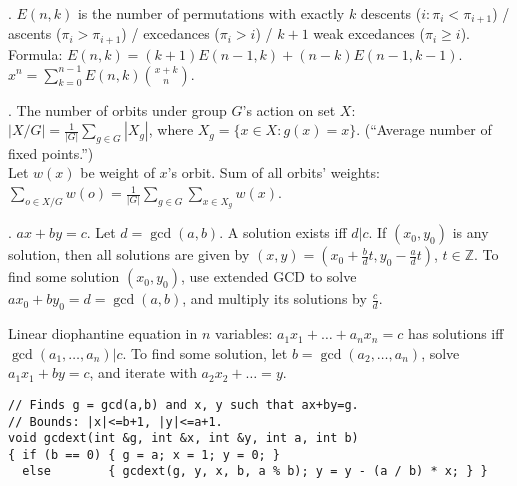 
.
$E(n,k)$ is the number of permutations with exactly
$k$ descents ($i: \pi_i < \pi_{i+1}$) /
ascents ($\pi_i > \pi_{i+1}$) /
excedances ($\pi_i > i$) /
$k+1$ weak excedances ($\pi_i \ge i$). \\
Formula: $E(n,k)=(k+1)E(n-1,k)+(n-k)E(n-1,k-1)$. \quad
$x^n = \sum_{k=0}^{n-1} E(n,k) {x+k \choose n}$.

.
The number of orbits under group $G$'s action on set $X$:\\
$|X/G| = \frac{1}{|G|} \sum_{g \in G} |X_g|$,
where $X_g=\{ x \in X: g(x)=x \}$. (``Average number of fixed points.'') \\
Let $w(x)$ be weight of $x$'s orbit. Sum of all orbits' weights:
$\sum_{o \in X/G} w(o) = \frac{1}{|G|} \sum_{g \in G} \sum_{x \in X_g} w(x)$.





. $ax+by=c$.
Let $d=\gcd(a,b)$. A solution exists iff $d|c$.
If $(x_0,y_0)$ is any solution, then all solutions are given by
$(x,y) = (x_0 + \frac{b}{d}t, y_0 - \frac{a}{d}t)$, $t \in {\mathbb Z}$.
To find some solution $(x_0, y_0)$, use extended GCD to solve
$ax_0 + by_0 = d = \gcd(a, b)$, and multiply its solutions by $\frac{c}{d}$.

Linear diophantine equation in $n$ variables:
$a_1 x_1 + \dots + a_n x_n = c$ has solutions iff $\gcd(a_1, \dots, a_n) | c$.
To find some solution, let $b=\gcd(a_2, \dots, a_n)$,
solve $a_1 x_1 + by = c$, and iterate with $a_2 x_2 + \dots = y$.

\begin{verbatim}
// Finds g = gcd(a,b) and x, y such that ax+by=g.
// Bounds: |x|<=b+1, |y|<=a+1.
void gcdext(int &g, int &x, int &y, int a, int b)
{ if (b == 0) { g = a; x = 1; y = 0; }
  else        { gcdext(g, y, x, b, a % b); y = y - (a / b) * x; } }
\end{verbatim}

